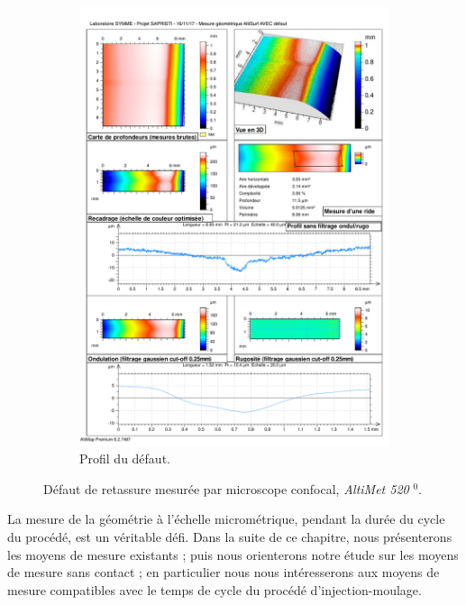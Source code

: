 \begin{figure}[tbhp]
\begin{subfigure}[c]{\textwidth}
		\includegraphics[width=\textwidth]{../Chap2/Figures/altisurf_defect_profil.pdf}
		\caption{Profil du défaut.}
	\end{subfigure}%
	\caption{Défaut de retassure mesurée par microscope confocal, \textit{AltiMet 520} $^0$.}
	\label{fig:confocal_defect}
\end{figure}
{}

\bigskip

La mesure de la géométrie à l'échelle micrométrique, pendant la durée du cycle du procédé, est un véritable défi.
Dans la suite de ce chapitre, nous présenterons les moyens de mesure existants ; puis nous orienterons notre étude sur les moyens de mesure sans contact ; en particulier nous nous intéresserons aux moyens de mesure compatibles avec le temps de cycle du procédé d'injection-moulage.


